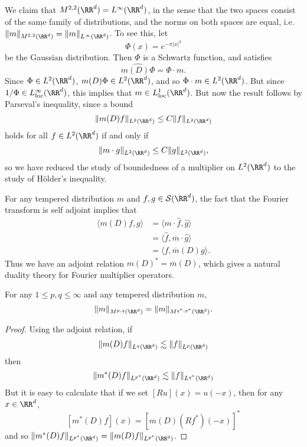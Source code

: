\begin{example}
    We claim that $M^{2,2}(\RR^d) = L^\infty(\RR^d)$, in the sense that the two spaces consist of the same family of distributions, and the norms on both spaces are equal, i.e. $\| m \|_{M^{2,2}(\RR^d)} = \| m \|_{L^\infty(\RR^d)}$. To see this, let
  \[ \Phi(x) = e^{- \pi |x|^2} \]
  be the Gaussian distribution. Then $\Phi$ is a Schwartz function, and satisfies
  \[ \widehat{m(D) \Phi} = \Phi \cdot m. \]
  Since $\Phi \in L^2(\RR^d)$, $m(D) \Phi \in L^2(\RR^d)$, and so $\Phi \cdot m \in L^2(\RR^d)$. But since $1/\Phi \in L^\infty_{\text{loc}}(\RR^d)$, this implies that $m \in L^1_{\text{loc}}(\RR^d)$. But now the result follows by Parseval's inequality, since a bound
  \[ \| m(D) f \|_{L^2(\RR^d)} \leq C \| f \|_{L^2(\RR^d)} \]
  holds for all $f \in L^2(\RR^d)$ if and only if
  \[ \| m \cdot g \|_{L^2(\RR^d)} \leq C \| g \|_{L^2(\RR^d)}, \]
  so we have reduced the study of boundedness of a multiplier on $L^2(\RR^d)$ to the study of H\"{o}lder's inequality.
\end{example}

For any tempered distribution $m$ and $f,g \in \mathcal{S}(\RR^d)$, the fact that the Fourier transform is self adjoint implies that
%
\begin{align*}
  \langle m(D) f, g \rangle &= \langle m \cdot \widehat{f}, \widehat{g} \rangle\\
  &= \langle \widehat{f}, \overline{m} \cdot \widehat{g} \rangle\\
  &= \langle f, \overline{m}(D) g \rangle.
\end{align*}
%
Thus we have an adjoint relation $m(D)^* = \overline{m}(D)$, which gives a natural duality theory for Fourier multiplier operators.

\begin{theorem}
  For any $1 \leq p,q \leq \infty$ and any tempered distribution $m$,
  \[ \| m \|_{M^{p,q}(\RR^d)} = \| m \|_{M^{q^*,p^*}(\RR^d)}. \]
\end{theorem}
\begin{proof}
  Using the adjoint relation, if
  \[ \| m(D) f \|_{L^q(\RR^d)} \lesssim \| f \|_{L^p(\RR^d)} \]
  then
  \[ \| m^*(D) f \|_{L^{p^*}(\RR^d)} \lesssim \| f \|_{L^{q^*}(\RR^d)} \]
  But it is easy to calculate that if we set $[Ru](x) = u(-x)$, then for any $x \in \RR^d$,
  \[ [m^*(D) f](x) = [m(D)(Rf^*)(-x)]^* \]
  and so $\| m^*(D) f \|_{L^{p^*}(\RR^d)} = \| m(D) f \|_{L^{p^*}(\RR^d)}$.
\end{proof}

